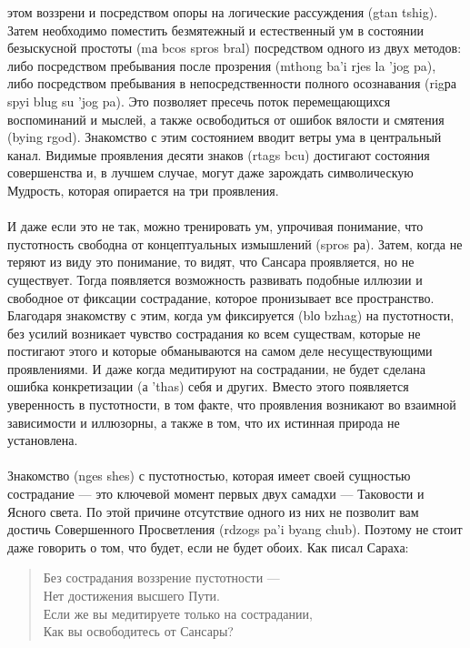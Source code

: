 \begin{siderules}
этом воззрени и посредством опоры на логические рассуждения (gtan tshig). Затем
необходимо поместить безмятежный и естественный ум в состоянии безыскусной простоты
(mа bcos spros bral) посредством одного из двух методов: либо посредством пребывания
после прозрения (mthong ba'i rjes la 'jog pa), либо посредством пребывания в
непосредственности полного осознавания (rigра spyi blug su 'jog pa). Это позволяет пресечь
поток перемещающихся воспоминаний и мыслей, а также освободиться от ошибок вялости и
смятения (bying rgod). Знакомство с этим состоянием вводит ветры ума в центральный канал.
Видимые проявления десяти знаков (rtags bcu) достигают состояния совершенства и, в
лучшем случае, могут даже зарождать символическую Мудрость, которая опирается на три
проявления.\\
\\
И даже если это не так, можно тренировать ум, упрочивая понимание, что пустотность
свободна от концептуальных измышлений (spros ра). Затем, когда не теряют из виду это
понимание, то видят, что Сансара проявляется, но не существует. Тогда появляется
возможность развивать подобные иллюзии и свободное от фиксации сострадание, которое
пронизывает все пространство. Благодаря знакомству с этим, когда ум фиксируется (blо
bzhag) на пустотности, без усилий возникает чувство сострадания ко всем существам,
которые не постигают этого и которые обманываются на самом деле несуществующими
проявлениями. И даже когда медитируют на сострадании, не будет сделана ошибка
конкретизации (а 'thas) себя и других. Вместо этого появляется уверенность в пустотности, в
том факте, что проявления возникают во взаимной зависимости и иллюзорны, а также в том,
что их истинная природа не установлена.\\
\\
Знакомство (nges shes) с пустотностью, которая имеет своей сущностью сострадание — это
ключевой момент первых двух самадхи — Таковости и Ясного света. По этой причине
отсутствие одного из них не позволит вам достичь Совершенного Просветления (rdzogs pa'i
byang chub). Поэтому не стоит даже говорить о том, что будет, если не будет обоих. Как
писал Сараха:

\begin{verse}
Без сострадания воззрение пустотности —\\
Нет достижения высшего Пути.\\
Если же вы медитируете только на сострадании,\\
Как вы освободитесь от Сансары?
\end{verse}


\end{siderules}
